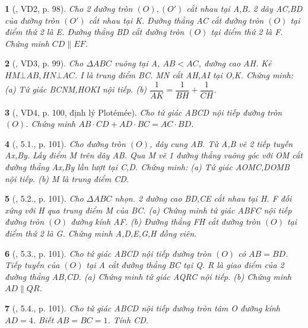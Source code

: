\documentclass{article}
\newtheorem{baitoan}{}
\begin{document}
\begin{baitoan}[\cite{Binh_boi_duong_Toan_9_tap_2}, VD2, p. 98]
	Cho 2 đường tròn $(O),(O')$ cắt nhau tại A,B. 2 dây AC,BD của đường tròn $(O')$ cắt nhau tại K. Đường thẳng AC cắt đường tròn $(O)$ tại điểm thứ 2 là E. Đường thẳng BD cắt đường tròn $(O)$ tại điểm thứ 2 là F. Chứng minh $CD\parallel EF$.
\end{baitoan}

\begin{baitoan}[\cite{Binh_boi_duong_Toan_9_tap_2}, VD3, p. 99]
	Cho $\Delta ABC$ vuông tại A, $AB < AC$, đường cao AH. Kẻ $HM\bot AB,HN\bot AC$. I là trung điểm BC. MN cắt AH,AI tại O,K. Chứng minh: (a) Tứ giác BCNM,HOKI nội tiếp. (b) $\dfrac{1}{AK} = \dfrac{1}{BH} + \dfrac{1}{CH}$.
\end{baitoan}

\begin{baitoan}[\cite{Binh_boi_duong_Toan_9_tap_2}, VD4, p. 100, định lý Plot\'em\'ee]
	Cho tứ giác ABCD nội tiếp đường tròn $(O)$. Chứng minh $AB\cdot CD + AD\cdot BC = AC\cdot BD$.
\end{baitoan}

\begin{baitoan}[\cite{Binh_boi_duong_Toan_9_tap_2}, 5.1., p. 101]
	Cho đường tròn $(O)$, dây cung AB. Từ A,B vẽ 2 tiếp tuyến Ax,By. Lấy điểm M trên dây AB. Qua M vẽ 1 đường thẳng vuông góc với OM cắt đường thẳng Ax,By lần lượt tại C,D. Chứng minh: (a) Tứ giác AOMC,DOMB nội tiếp. (b) M là trung điểm CD.
\end{baitoan}

\begin{baitoan}[\cite{Binh_boi_duong_Toan_9_tap_2}, 5.2., p. 101]
	Cho $\Delta ABC$ nhọn. 2 đường cao BD,CE cắt nhau tại H. F đối xứng với H qua trung điểm M của BC. (a) Chứng minh tứ giác ABFC nội tiếp đường tròn $(O)$ đường kính AF. (b) Đường thẳng FH cắt đường tròn $(O)$ tại điểm thứ 2 là G. Chứng minh A,D,E,G,H đồng viên.
\end{baitoan}

\begin{baitoan}[\cite{Binh_boi_duong_Toan_9_tap_2}, 5.3., p. 101]
	Cho tứ giác ABCD nội tiếp đường tròn $(O)$ có $AB = BD$. Tiếp tuyến của $(O)$ tại A cắt đường thẳng BC tại Q. R là giao điểm của 2 đường thẳng AB,CD. (a) Chứng minh tứ giác AQRC nội tiếp. (b) Chứng minh $AD\parallel QR$.
\end{baitoan}

\begin{baitoan}[\cite{Binh_boi_duong_Toan_9_tap_2}, 5.4., p. 101]
	Cho tứ giác ABCD nội tiếp đường tròn tâm O đường kính $AD = 4$. Biết $AB = BC = 1$. Tính CD.
\end{baitoan}
\end{document}
